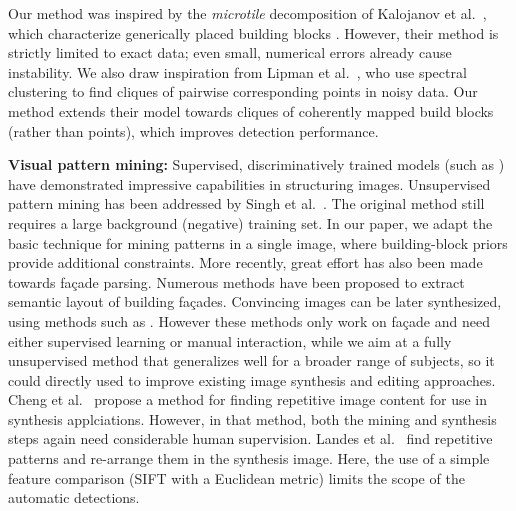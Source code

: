 \documentclass{acmtog}
\begin{document}
 Our method was inspired by the \emph{microtile} decomposition of Kalojanov et al.~, which characterize generically placed building blocks . However, their method is strictly limited to exact data; even small, numerical errors already cause instability. We also draw inspiration from Lipman et al.~\cite{LIPMANsig2010}, who use spectral clustering to find cliques of pairwise corresponding points in noisy data. Our method extends their model towards cliques of coherently mapped build blocks (rather than points), which improves detection performance.

\textbf{Visual pattern mining:} Supervised, discriminatively trained models (such as \cite{Felzenszwalb2010DPM}) have demonstrated impressive capabilities in structuring images. Unsupervised pattern mining has been addressed by Singh et al.~. The original method still requires a large background (negative) training set. In our paper, we adapt the basic technique for mining patterns in a single image, where building-block priors provide additional constraints. More recently, great effort has also been made towards fa{\c{c}}ade parsing. Numerous methods \cite{Teboul2011SG,Martinovic2012AT,Bao2013PF} have been proposed to extract semantic layout of building fa{\c{c}}ades. Convincing images can be later synthesized, using methods such as \cite{Dai2013Facade}. However these methods only work on fa{\c{c}}ade and need either supervised learning or manual interaction, while we aim at a fully unsupervised method that generalizes well for a broader range of subjects, so it could  directly used to improve existing image synthesis and editing approaches. 
Cheng et al.~\cite{Cheng2010RepFinder} propose a method for finding repetitive image content for use in synthesis applciations. However, in that method, both the mining and synthesis steps again need considerable human supervision. Landes et al.~\cite{Landes2009} find repetitive patterns and re-arrange them in the synthesis image. Here, the use of a simple feature comparison (SIFT with a Euclidean metric) limits the scope of the automatic detections.
\end{document}
